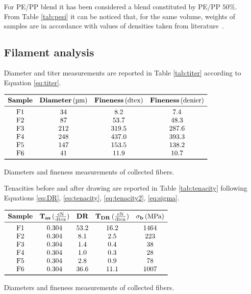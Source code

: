 \documentclass[a4paper, 11pt]{article}
\begin{document}
For PE/PP blend it has been considered a blend constituted by PE/PP $50\%$. From Table \ref{tab:pesi} it can be noticed that, for the same volume, weights of samples are in accordance with values of densities taken from literature~\cite{handbook}. 

\newpage

\subsection{Filament analysis}

Diameter and titer measurements are reported in Table \ref{tab:titer} according to Equation \ref{eq:titer}.
\begin{table}[htp]
\centering
$
\begin{array}{cccc}
\toprule
\textbf{Sample} & \textbf{Diameter} \, (\text{µm}) & \textbf{Fineness}\, (\text{dtex}) & \textbf{Fineness} \, (\text{denier}) \\
\midrule
\text{F1} & 34 & 8.2 & 7.4 \\
\text{F2} & 87 & 53.7 & 48.3 \\ 
\text{F3} & 212 & 319.5 & 287.6 \\
\text{F4} & 248 & 437.0 & 393.3 \\
\text{F5} & 147 & 153.5 & 138.2 \\
\text{F6} & 41 & 11.9 & 10.7 \\
\bottomrule
\end{array}
$
\caption{Diameters and fineness measurements of collected fibers.}
\label{tab:titer}
\end{table}

Tenacities before and after drawing are reported in Table \ref{tab:tenacity} following Equations \ref{eq:DR}, \ref{eq:tenacity}, \ref{eq:tenacity2}, \ref{eq:sigma}.
\begin{table}[htp]
\centering
$
\begin{array}{ccccc}
\toprule
\textbf{Sample} & \mathbf{T_{as}} \, (\frac{\text{cN}}{\text{dtex}}) & \textbf{DR} & \mathbf{T_{DR}}\, (\frac{\text{cN}}{\text{dtex}}) & \mathbf{\sigma_b} \, (\text{MPa})\\
\midrule
\text{F1} & 0.304 & 53.2 & 16.2 & 1464\\
\text{F2} & 0.304 & 8.1 & 2.5 & 223\\ 
\text{F3} & 0.304 & 1.4 & 0.4 & 38\\
\text{F4} & 0.304 & 1.0 & 0.3 & 28\\
\text{F5} & 0.304 & 2.8 & 0.9 & 78\\
\text{F6} & 0.304 & 36.6 & 11.1 & 1007\\
\bottomrule
\end{array}
$
\caption{Diameters and fineness measurements of collected fibers.}
\label{tab:tenacity}
\end{table}
\end{document}
